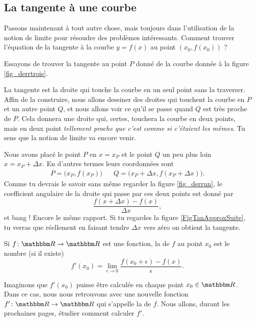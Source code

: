 					\subsection{La tangente à une courbe}

Passons maintenant à tout autre chose, mais toujours dans l'utilisation de la notion de limite pour résoudre des problèmes intéressants. Comment trouver l'équation de la tangente à la courbe $y=f(x)$ au point $(x_0,f(x_0))$ ?

Essayons de trouver la tangente au point $P$ donné de la courbe donnée à la figure \ref{fig_derrtrois}.







La tangente est la droite qui touche la courbe en un seul point sans la traverser. Affin de la construire, nous allons dessiner des droites qui touchent la courbe en $P$ et un autre point $Q$, et nous allons voir ce qu'il se passe quand $Q$ est très proche de $P$. Cela donnera une droite qui, certes, touchera la courbe en deux points, mais en deux point \emph{tellement proche que c'est comme si c'étaient les mêmes}. Tu sens que la notion de limite va encore venir.

Nous avons placé le point $P$ en $x=x_P$ et le point $Q$ un peu plus loin $x=x_P+\Delta x$. En d'autres termes leurs coordonnées sont
\begin{align}
	P=\big(x_P,f(x_P)\big)&& Q=\big(x_P+\Delta x,f(x_P+\Delta x)\big).
\end{align}
Comme tu devrais le savoir sans même regarder la figure \ref{fig_derrun}, le coefficient angulaire de la droite qui passe par ces deux points est donné par
\begin{equation}
	\frac{ f(x+\Delta x)-f(x) }{ \Delta x },
\end{equation}
et bang ! Encore le même rapport. Si tu regardes la figure \ref{FigTanApproxSuite}, tu verras que réellement en faisant tendre $\Delta x$ vers zéro on obtient la tangente.



\begin{definition}
Si $f\colon \eR\to \eR$ est une fonction, la  de $f$ au point $x_0$ est le nombre (si il existe)
\begin{equation}
	f'(x_0)=\lim_{\epsilon\to 0}\frac{ f(x_0+\epsilon)-f(x) }{ \epsilon }.
\end{equation}
\end{definition}
Imaginons que $f'(x_0)$ puisse être calculée en chaque point $x_0\in\eR$. Dans ce cas, nous nous retrouvons avec une nouvelle fonction $f'\colon \eR\to \eR$ qui s'appelle la  de $f$. Nous allons, durant les prochaines pages, étudier comment calculer $f'$.

